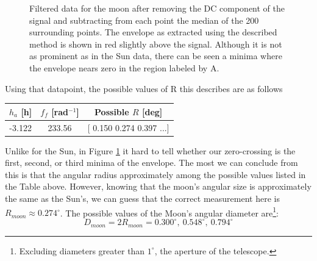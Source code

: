 \documentclass[12pt]{article}
\begin{document}
\begin{figure}[H]
\caption[SODUMB]{Filtered data for the moon after removing the DC component of the signal and subtracting from each point the median of the 200 surrounding points. The envelope as extracted using the described method is shown in red slightly above the signal. Although it is not as prominent as in the Sun data, there can be seen a minima where the envelope nears zero in the region labeled by A.}
\label{fig:moonenvelope}
\end{figure}

Using that datapoint, the possible values of R this describes are as follows
\begin{table}[H]
\begin{center}
  \begin{tabular}{c | c | c }
    $h_a$ [h] & $f_f$ [rad$^{-1}$] & Possible $R$ [deg]\\ \hline
    -3.122 & 233.56 &  [ 0.150  0.274 0.397 ...] \\
    \end{tabular}
\end{center}
\end{table}
Unlike for the Sun, in Figure \ref{fig:moonenvelope} it hard to tell whether our zero-crossing is the first, second, or third minima of the envelope. The most we can conclude from this is that the angular radius approximately among the possible values listed in the Table above. However, knowing that the moon's angular size is approximately the same as the Sun's, we can guess that the correct measurement here is $R_{moon}\approx 0.274^\circ$. The possible values of the Moon's angular diameter are\footnote{Excluding diameters greater than $1^\circ$, the aperture of the telescope.}:
\begin{equation}
D_{moon} = 2 R_{moon} = 0.300^\circ,\ \mathbf{0.548^\circ},\ 0.794^\circ
\end{equation}
\end{document}
